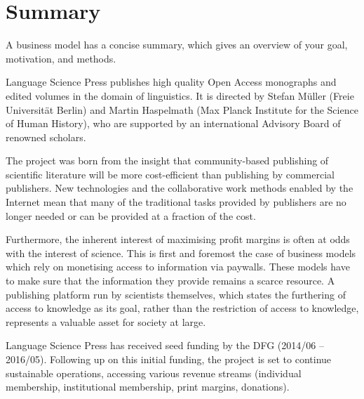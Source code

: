 \documentclass[nonflat,smallfont
]{langsci/langscibook}
\newcommand{\background}[1]{ 
  \vspace{5mm}
  \renewcommand{\tblslinecolour}{lsDarkBlue}
  \tblssy[red]{explore2}{Background}{\vspace*{-5mm}#1}
}
\newcommand{\langscisolution}[1]{
  \renewcommand{\tblslinecolour}{lsLightBlue}
  \tblssy{langsci}{LangSci solution}{\vspace*{-5mm}#1}
}
\renewcommand{\tblssy}[4][black!12]{%
  \renewcommand{\langscisymbol}{#2}\renewcommand{\tblsboxcolor}{#1}
  \begin{mdframed}[style=yellowexercise,frametitle={#3}]
    #4
  \end{mdframed}
}
\begin{document}
\chapter{Summary} 
\background{ 
A business model has a concise summary, which gives an overview of your goal, motivation, and methods.
}
\langscisolution{ 
Language Science Press publishes high quality Open Access monographs and edited volumes in the domain of linguistics. It is directed by Stefan Müller (Freie Universität Berlin) and Martin Haspelmath (Max Planck Institute for the Science of Human History), who are supported by an international Advisory Board of renowned scholars.

The project was born from the insight that community-based publishing of scientific literature will be more cost-efficient than publishing by commercial publishers. New technologies and the collaborative work methods enabled by the Internet mean that many of the traditional tasks provided by publishers are no longer needed or can be provided at a fraction of the cost. 

Furthermore, the inherent interest of maximising profit margins is often at odds with the interest of science. This is first and foremost the case of business models which rely on monetising access to information via paywalls. These models have to make sure that the information they provide remains a scarce resource. A publishing platform run by scientists themselves, which states the furthering of access to knowledge as its goal, rather than the restriction of access to knowledge, represents a valuable asset for society at large. 

Language Science Press has received seed funding by the DFG (2014/06 – 2016/05). Following up on this initial funding, the project is set to continue sustainable operations, accessing various revenue streams (individual membership, institutional membership, print margins, donations). 

}
\end{document}
